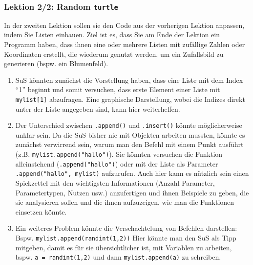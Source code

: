 \begin{myExBox}[title=DL \themycounter]
\subsubsection*{Lektion 2/2: Random \lstinline|turtle|}
In der zweiten Lektion sollen sie den Code aus der vorherigen Lektion anpassen, indem Sie Listen einbauen. Ziel ist es, dass Sie am Ende der Lektion ein Programm haben, dass ihnen eine oder mehrere Listen mit zufällige Zahlen oder Koordinaten erstellt, die wiederum genutzt werden, um ein Zufallsbild zu generieren (bspw. ein Blumenfeld).

\begin{myExBox}[title=Mögliche Schwierigkeiten \& geeignete Massnahmen]
\begin{enumerate}
    \item SuS könnten zunächst die Vorstellung haben, dass eine Liste mit dem Index ``1'' beginnt und somit versuchen, dass erste Element einer Liste mit \lstinline|mylist[1]| abzufragen. Eine graphische Darstellung, wobei die Indizes direkt unter der Liste angegeben sind, kann hier weiterhelfen.
    \item Der Unterschied zwischen \lstinline|.append()| und \lstinline|.insert()| könnte möglicherweise unklar sein. Da die SuS bisher nie mit Objekten arbeiten mussten, könnte es zunächst verwirrend sein, warum man den Befehl mit einem Punkt ausführt (z.B. \lstinline|mylist.append("hallo")|). Sie könnten versuchen die Funktion alleinstehend (\lstinline|.append("hallo")|) oder mit der Liste als Parameter \lstinline|.append("hallo", mylist)| aufzurufen. Auch hier kann es nützlich sein einen Spickzettel mit den wichtigsten Informationen (Anzahl Parameter, Parametertypen, Nutzen usw.) anzufertigen und ihnen Beispiele zu geben, die sie analysieren sollen und die ihnen aufzuzeigen, wie man die Funktionen einsetzen könnte.
    \item Ein weiteres Problem könnte die Verschachtelung von Befehlen darstellen: Bspw. \lstinline|mylist.append(randint(1,2))| Hier könnte man den SuS als Tipp mitgeben, damit es für sie übersichtlicher ist, mit Variablen zu arbeiten, bspw. \lstinline|a = randint(1,2)| und dann \lstinline|mylist.append(a)| zu schreiben.
\end{enumerate}
\end{myExBox}
\end{myExBox}
\newpage{}
